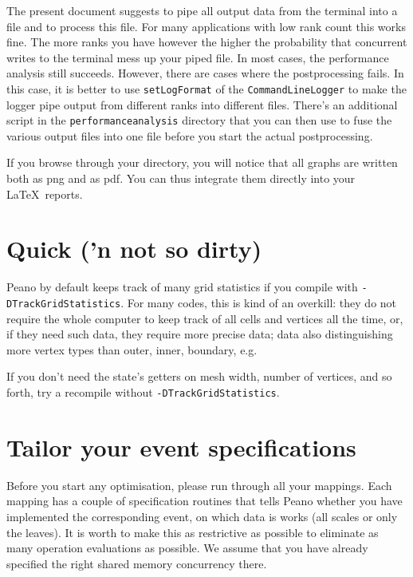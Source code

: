 \begin{remark}
The present document suggests to pipe all output data from the terminal into a
file and to process this file. 
For many applications with low rank count this works fine.
The more ranks you have however the higher the probability that concurrent
writes to the terminal mess up your piped file.
In most cases, the performance analysis still succeeds. 
However, there are cases where the postprocessing fails.
In this case, it is better to use \texttt{setLogFormat} of the
\texttt{CommandLineLogger} to make the logger pipe output from different ranks
into different files.
There's an additional script in the \texttt{performanceanalysis} directory that
you can then use to fuse the various output files into one file before you start
the actual postprocessing.
\end{remark}



\noindent
If you browse through your directory, you will notice that all graphs are
written both as png and as pdf. 
You can thus integrate them directly into your \LaTeX\ reports.


\section{Quick ('n not so dirty)}

\noindent
Peano by default keeps track of many grid statistics if you compile with
\texttt{-DTrackGridStatistics}.
For many codes, this is kind of an overkill: they do not require the whole
computer to keep track of all cells and vertices all the time, or, if they need
such data, they require more precise data; data also distinguishing more vertex
types than outer, inner, boundary, e.g.

If you don't need the state's getters on mesh width, number of vertices, and so
forth, try a recompile without \texttt{-DTrackGridStatistics}.


\section{Tailor your event specifications}

Before you start any optimisation, please run through all your mappings. 
Each mapping has a couple of specification routines that tells Peano whether
you have implemented the corresponding event, on which data is works (all
scales or only the leaves).
It is worth to make this as restrictive as possible to eliminate as many
operation evaluations as possible.
We assume that you have already specified the right shared memory concurrency
there.

